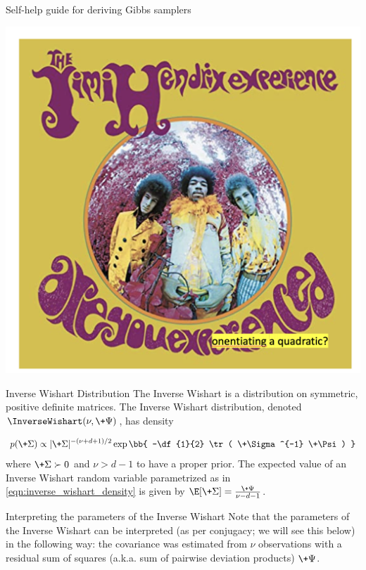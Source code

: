 \documentclass[10pt]{beamer}
\begin{document}
\begin{frame}{Self-help guide for deriving Gibbs samplers}
\begin{center}
\includegraphics[width=.8\textwidth]{images/are_you_exponentiating_a_quadratic}	
\end{center}

\end{frame}

\begin{frame}{Inverse Wishart Distribution}
The Inverse Wishart is a distribution on symmetric,  positive definite matrices.     The Inverse Wishart distribution,  denoted $\InverseWishart(\nu, \+\Psi)$,  has density

\begin{align}
p(\+\Sigma) \propto | \+\Sigma|^{-(\nu+d +1) /2}  \exp \bb{ -\df{1}{2} \tr ( \+\Sigma^{-1} \+\Psi) } 
\label{eqn:inverse_wishart_density}
\end{align}
where $\+\Sigma \succ 0$ and $\nu > d-1$ to have a proper prior.     The expected value of an Inverse Wishart random variable parametrized as in \eqref{eqn:inverse_wishart_density} is given by $\E[\+\Sigma] = \frac{\+\Psi}{\nu -d -1}$.   

\begin{block}{Interpreting the parameters of the Inverse Wishart}
Note that the parameters of the Inverse Wishart can be interpreted {\tiny (as per conjugacy; we will see this below) } in the following way: the covariance was estimated from $\nu$ observations with a residual sum of squares (a.k.a.  sum of pairwise deviation products) $\+\Psi$. 
 \end{block}

\end{frame}
\end{document}
